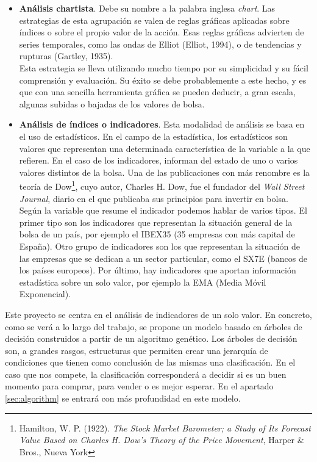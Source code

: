 \begin{itemize}
    \item \textbf{An\'alisis chartista}. Debe su nombre a la palabra inglesa \textit{chart}. Las estrategias de esta agrupaci\'on se valen de reglas gr\'aficas aplicadas sobre \'indices o sobre el propio valor de la acci\'on. Esas reglas gr\'aficas advierten de series temporales, como las ondas de Elliot (Elliot, 1994), o de tendencias y rupturas (Gartley, 1935). \\
    
    Esta estrategia se lleva utilizando mucho tiempo por su simplicidad y su f\'acil comprensi\'on y evaluaci\'on.
    Su \'exito se debe probablemente a este hecho, y es que con una sencilla herramienta gr\'afica se pueden deducir, a gran escala, algunas subidas o bajadas de los valores de bolsa.
    
    \item \textbf{An\'alisis de \'indices o indicadores}. Esta modalidad de an\'alisis se basa en el uso de estad\'isticos. En el campo de la estad\'istica, los estad\'isticos son valores que representan una determinada caracter\'istica de la variable a la que refieren. En el caso de los indicadores, informan del estado de uno o varios valores distintos de la bolsa. Una de las publicaciones con m\'as renombre es la teor\'ia de Dow\footnote{Hamilton, W. P. (1922). \textit{The Stock Market Barometer; a Study of Its Forecast Value Based on Charles H. Dow's Theory of the Price Movement}, Harper \& Bros., Nueva York}, cuyo autor, Charles H. Dow, fue el fundador del \textit{Wall Street Journal}, diario en el que publicaba sus principios para invertir en bolsa. \\
    
    Seg\'un la variable que resume el indicador podemos hablar de varios tipos. El primer tipo son los indicadores que representan la situaci\'on general de la bolsa de un pa\'is, por ejemplo el IBEX35 (35 empresas con m\'as capital de Espa\~na). Otro grupo de indicadores son los que representan la situaci\'on de las empresas que se dedican a un sector particular, como el  SX7E (bancos de los pa\'ises europeos).
    Por \'ultimo, hay indicadores que aportan informaci\'on estad\'istica sobre un solo valor, por ejemplo la EMA (Media M\'ovil Exponencial).
\end{itemize}

Este proyecto se centra en el an\'alisis de indicadores de un solo valor. En concreto, como se ver\'a a lo largo del trabajo, se propone un modelo basado en \'arboles de decisi\'on construidos a partir de un algoritmo gen\'etico. Los \'arboles de decisi\'on son, a grandes rasgos, estructuras que permiten crear una jerarqu\'ia de condiciones que tienen como conclusi\'on de las mismas una clasificaci\'on. En el caso que nos compete, la clasificaci\'on corresponder\'a a decidir si es un buen momento para comprar, para vender o es mejor esperar. En el apartado \ref{sec:algorithm} se entrar\'a con m\'as profundidad en este modelo. \\



